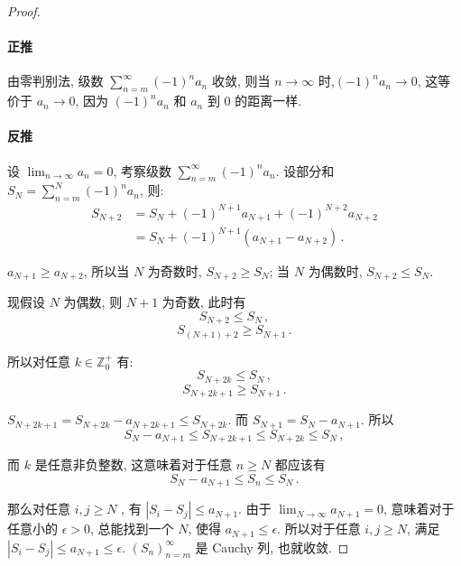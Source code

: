\documentclass[UTF8]{ctexart}
\theoremstyle{mystyle}
\theoremstyle{myremark}
\theoremstyle{plain}
\newcommand{\Z}{\mathbb Z}
\begin{document}
\begin{proof} \ 
    \paragraph{正推} 由零判别法, 级数 $ \displaystyle \sum_{n = m}^\infty (-1)^n a_n $ 收敛, 则当 $ n \to \infty $ 时,$ (-1)^n a_n \to 0 $, 这等价于 $ a_n \to 0 $, 因为 $ (-1)^n a_n $ 和 $ a_n $ 到 $ 0 $ 的距离一样.

    \paragraph{反推} 设 $ \displaystyle \lim_{n \to \infty} a_n = 0 $, 考察级数 $ \displaystyle \sum_{n = m}^\infty (-1)^n a_n $. 设部分和 $ \displaystyle S_N = \sum_{n = m}^{N} (-1)^n a_n $, 则:
    \begin{align*}
        S_{N + 2} &= S_N + (-1)^{N+1} a_{N+1} + (-1)^{N+2} a_{N+2} \\
        &= S_N + (-1)^{N+1} (a_{N+1} - a_{N+2}) \,.
    \end{align*}

    $ a_{N + 1} \geqslant a_{N + 2} $, 所以当 $ N $ 为奇数时, $ S_{N + 2} \geqslant S_N $; 当 $ N $ 为偶数时, $ S_{N + 2} \leqslant S_N $.
    
    现假设 $ N $ 为偶数, 则 $ N + 1 $ 为奇数, 此时有
    \[ S_{N + 2} \leqslant S_N \,,\]
    \[ S_{(N + 1) + 2} \geqslant S_{N + 1} \,.\]

    所以对任意 $ k \in \Z_0^+ $ 有:
    \[ S_{N + 2k} \leqslant S_N \,,\]
    \[ S_{N + 2k + 1} \geqslant S_{N + 1} \,.\]

    $ S_{N + 2k + 1} = S_{N + 2k} - a_{N + 2k + 1} \leqslant S_{N + 2k} $. 而 $ S_{N + 1} = S_N - a_{N + 1} $. 所以
    \[ S_N - a_{N + 1} \leqslant S_{N + 2k + 1} \leqslant S_{N + 2k} \leqslant S_N \,,\]

    而 $ k $ 是任意非负整数, 这意味着对于任意 $ n \geqslant N $ 都应该有
    \[ S_N - a_{N + 1} \leqslant S_n \leqslant S_N \,.\]

    那么对任意 $ i, j \geqslant N $ , 有 $ |S_i - S_j| \leqslant a_{N + 1} $. 由于 $ \displaystyle \lim_{N \to \infty} a_{N + 1} = 0 $, 意味着对于任意小的 $ \epsilon > 0 $, 总能找到一个 $ N $, 使得 $ a_{N + 1} \leqslant \epsilon $. 所以对于任意 $ i, j \geqslant N $, 满足 $ |S_i - S_j| \leqslant a_{N + 1} \leqslant \epsilon $. $ (S_n)_{n = m}^\infty $ 是 Cauchy 列, 也就收敛.
\end{proof}
\end{document}
